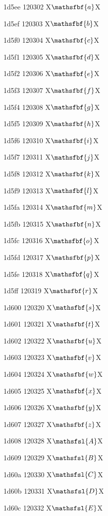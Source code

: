 \documentclass[11pt]{article}
\begin{document}
1d5ee 120302 X{\ensuremath{\mathsfbf{a}}}X

1d5ef 120303 X{\ensuremath{\mathsfbf{b}}}X

1d5f0 120304 X{\ensuremath{\mathsfbf{c}}}X

1d5f1 120305 X{\ensuremath{\mathsfbf{d}}}X

1d5f2 120306 X{\ensuremath{\mathsfbf{e}}}X

1d5f3 120307 X{\ensuremath{\mathsfbf{f}}}X

1d5f4 120308 X{\ensuremath{\mathsfbf{g}}}X

1d5f5 120309 X{\ensuremath{\mathsfbf{h}}}X

1d5f6 120310 X{\ensuremath{\mathsfbf{i}}}X

1d5f7 120311 X{\ensuremath{\mathsfbf{j}}}X

1d5f8 120312 X{\ensuremath{\mathsfbf{k}}}X

1d5f9 120313 X{\ensuremath{\mathsfbf{l}}}X

1d5fa 120314 X{\ensuremath{\mathsfbf{m}}}X

1d5fb 120315 X{\ensuremath{\mathsfbf{n}}}X

1d5fc 120316 X{\ensuremath{\mathsfbf{o}}}X

1d5fd 120317 X{\ensuremath{\mathsfbf{p}}}X

1d5fe 120318 X{\ensuremath{\mathsfbf{q}}}X

1d5ff 120319 X{\ensuremath{\mathsfbf{r}}}X

1d600 120320 X{\ensuremath{\mathsfbf{s}}}X

1d601 120321 X{\ensuremath{\mathsfbf{t}}}X

1d602 120322 X{\ensuremath{\mathsfbf{u}}}X

1d603 120323 X{\ensuremath{\mathsfbf{v}}}X

1d604 120324 X{\ensuremath{\mathsfbf{w}}}X

1d605 120325 X{\ensuremath{\mathsfbf{x}}}X

1d606 120326 X{\ensuremath{\mathsfbf{y}}}X

1d607 120327 X{\ensuremath{\mathsfbf{z}}}X

1d608 120328 X{\ensuremath{\mathsfsl{A}}}X

1d609 120329 X{\ensuremath{\mathsfsl{B}}}X

1d60a 120330 X{\ensuremath{\mathsfsl{C}}}X

1d60b 120331 X{\ensuremath{\mathsfsl{D}}}X

1d60c 120332 X{\ensuremath{\mathsfsl{E}}}X
\end{document}
